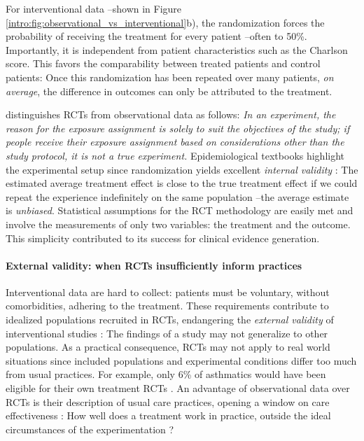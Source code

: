 \documentclass[french,12pt,twoside,a4paper]{book}
\begin{document}
\begin{background_box_left}

  For interventional data --shown in Figure
  \ref{intro:fig:observational_vs_interventional}b), the randomization forces
  the probability of receiving the treatment for every patient --often to 50\%.
  Importantly, it is independent from patient characteristics such as the
  Charlson score. This favors the comparability between treated patients and
  control patients: Once this randomization has been repeated over many
  patients, \emph{on average}, the difference in outcomes can only be attributed
  to the treatment.

  \cite{rothman2012epidemiology} distinguishes RCTs from observational data as
  follows: \textit{In an experiment, the reason for the exposure assignment is
    solely to suit the objectives of the study; if people receive their exposure
    assignment based on considerations other than the study protocol, it is not a
    true experiment.} Epidemiological textbooks highlight the experimental setup
  since randomization yields excellent \emph{internal validity}
  \citep{campbell1957factors}: The estimated average treatment effect is close to the
  true treatment effect if we could repeat the experience indefinitely on the
  same population --the average estimate is \emph{unbiased}. Statistical assumptions for
  the RCT methodology are easily met \citep[Section 3.1.1]{colnet2020causal} and involve the
  measurements of only two variables: the treatment and the outcome. This
  simplicity contributed to its success for clinical evidence generation.

  \paragraph{External validity: when RCTs insufficiently inform practices}\label{def:external_validity}
  Interventional data are hard to collect: patients must be voluntary, without
  comorbidities, adhering to the treatment. These requirements contribute to
  idealized populations recruited in RCTs, endangering the \emph{external
    validity} of interventional studies
  \citep{feinstein1997problems,concato2000randomized,rothwell2005external}: The
  findings of a study may not generalize to other populations. As a practical
  consequence, RCTs may not apply to real world situations since included
  populations and experimental conditions differ too much from usual practices.
  For example, only 6\% of asthmatics would have been eligible for their own
  treatment RCTs \citep{travers2007external}. An advantage of observational data
  over RCTs is their description of usual care practices, opening a window on
  care effectiveness \citep{cochrane1972effectiveness}: How well does a
  treatment work in practice, outside the ideal circumstances of the
  experimentation ?


\end{background_box_left}
\end{document}
